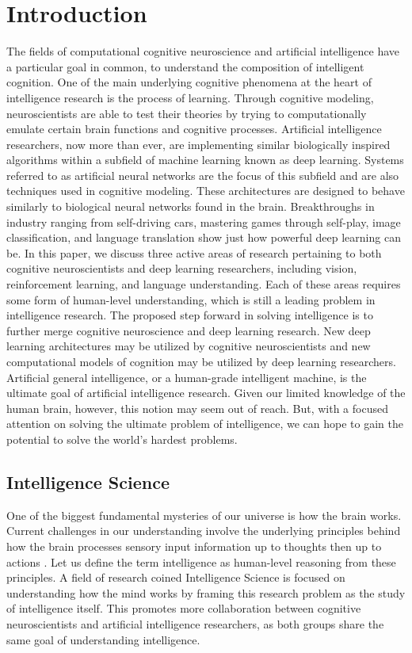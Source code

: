 \documentclass[12pt]{article}
\begin{document}
\section{Introduction}
The fields of computational cognitive neuroscience and artificial intelligence have a particular goal in common, to understand the composition of intelligent cognition. One of the main underlying cognitive phenomena at the heart of intelligence research is the process of learning. Through cognitive modeling, neuroscientists are able to test their theories by trying to computationally emulate certain brain functions and cognitive processes. Artificial intelligence researchers, now more than ever, are implementing similar biologically inspired algorithms within a subfield of machine learning known as deep learning. Systems referred to as artificial neural networks are the focus of this subfield and are also techniques used in cognitive modeling. These architectures are designed to behave similarly to biological neural networks found in the brain. Breakthroughs in industry ranging from self-driving cars, mastering games through self-play, image classification, and language translation show just how powerful deep learning can be. In this paper, we discuss three active areas of research pertaining to both cognitive neuroscientists and deep learning researchers, including vision, reinforcement learning, and language understanding. Each of these areas requires some form of human-level understanding, which is still a leading problem in intelligence research. The proposed step forward in solving intelligence is to further merge cognitive neuroscience and deep learning research. New deep learning architectures may be utilized by cognitive neuroscientists and new computational models of cognition may be utilized by deep learning researchers. Artificial general intelligence, or a human-grade intelligent machine, is the ultimate goal of artificial intelligence research. Given our limited knowledge of the human brain, however, this notion may seem out of reach. But, with a focused attention on solving the ultimate problem of intelligence, we can hope to gain the potential to solve the world’s hardest problems.

\subsection{Intelligence Science}
One of the biggest fundamental mysteries of our universe is how the brain works. Current challenges in our understanding involve the underlying principles behind how the brain processes sensory input information up to thoughts then up to actions \cite{c11}. Let us define the term intelligence as human-level reasoning from these principles. A field of research coined Intelligence Science \cite{c1} is focused on understanding how the mind works by framing this research problem as the study of intelligence itself. This promotes more collaboration between cognitive neuroscientists and artificial intelligence researchers, as both groups share the same goal of understanding intelligence.
\end{document}

